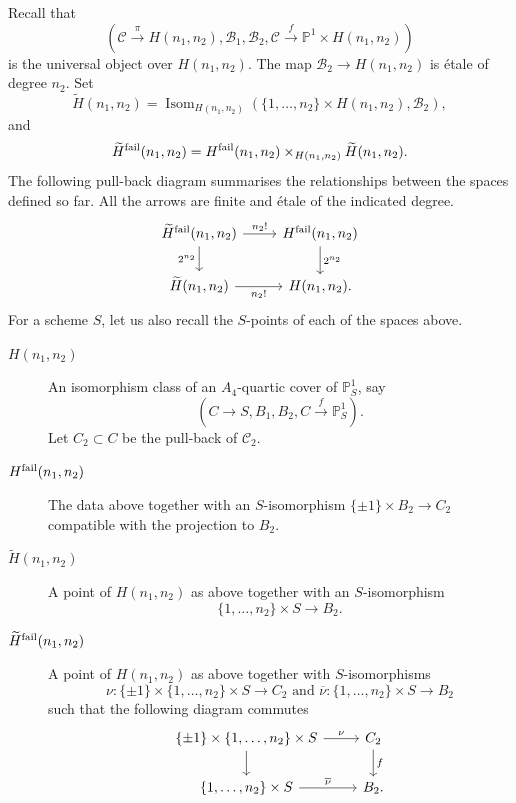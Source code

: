\documentclass{amsart}
\numberwithin{equation}{section} \numberwithin{figure}{section}
\newcommand\PP{\mathbb{P}}
\theoremstyle{one}
\theoremstyle{definition}
\begin{document}
Recall that
\[(\mathcal{C} \xrightarrow{\pi} H(n_1,n_2), \mathcal{B}_1, \mathcal{B}_2, \mathcal{C} \xrightarrow{f} \PP^1 \times H(n_1,n_2))\]
is the universal object over \(H(n_1,n_2)\).
The map \(\mathcal{B}_2 \to H(n_1,n_2)\) is \'etale of degree \(n_2\).
Set
\begin{equation}\label{eqn:Htilde}
  \widetilde H(n_1,n_2) = \operatorname{Isom}_{H(n_1,n_2)}(\{1,\dots, n_2\} \times H(n_1,n_2), \mathcal{B}_2),
\end{equation}
and
\begin{equation}\label{eqn:failproduct}
    \widetilde H^{\rm fail} (n_1,n_2) = H^{\rm fail}(n_1,n_2) \times_{H(n_1,n_2)} \widetilde H(n_1,n_2).
  \end{equation}
The following pull-back diagram summarises the relationships between the spaces defined so far.
All the arrows are finite and \'etale of the indicated degree.
  \begin{equation}\label{eqn:fourspaces-degrees}
  \begin{tikzcd}
    \widetilde H^{\rm fail}(n_1,n_{2})\ar{d}[left]{2^{n_2}}\ar{r}{n_2!} & H^{\rm fail}(n_1,n_2)\ar{d}{2^{n_2}} \\
    \widetilde H(n_1,n_2)\ar{r}[below]{n_{2}!} & H(n_1,n_2).
  \end{tikzcd}
\end{equation}
For a scheme \(S\), let us also recall the \(S\)-points of each of the spaces above.
\begin{description}
\item[\(H(n_1,n_2)\)]\label{eqn:descH} An isomorphism class of an \(A_4\)-quartic cover of \(\PP^1_S\), say \[(C \to S, B_1,B_2,  C \xrightarrow{f} \PP^1_{S}).\]
  Let \(C_2 \subset C\) be the pull-back of \(\mathcal{C}_2\).
\item[\(H^{\rm fail}(n_1,n_2)\)]
  The data above together with an \(S\)-isomorphism \(\{\pm 1\} \times B_2 \to C_2\) compatible with the projection to \(B_2\).
\item[\(\widetilde H(n_1,n_2)\)] A point of \(H(n_1,n_2)\) as above together with an \(S\)-isomorphism \[\{1,\dots,n_2\} \times S \to B_2.\]
\item[\(\widetilde H^{\rm fail}(n_1,n_2)\)] A point of \(H(n_1,n_2)\) as above together with \(S\)-isomorphisms
  \[ \nu \colon \{\pm 1\} \times \{1,\dots,n_2\} \times S \to C_2 \text{ and } \overline\nu \colon \{1,\dots,n_2\} \times S \to B_2\]
  such that the following diagram commutes
  \[
    \begin{tikzcd}
      \{\pm 1\} \times \{1, \dots, n_2\} \times S \ar{r}{\nu}\ar{d} & C_2 \ar{d}{f}\\
      \{1,\dots,n_2\} \times S \ar{r}{\overline \nu} & B_2.
    \end{tikzcd}
    \]
\end{description}
\end{document}
